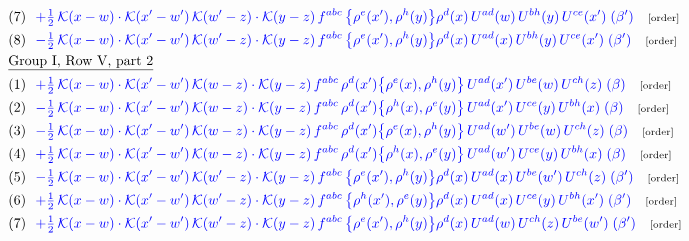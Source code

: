 \documentclass[9pt]{article}
\begin{document}
\begin{align}
&\quad\text{(7)}\ \ \textcolor{blue}{+\tfrac12\,\mathcal{K}(x-w)\cdot\mathcal{K}(x'-w')\,\mathcal{K}(w'-z)\cdot\mathcal{K}(y-z)\, f^{abc}\,\big\{\rho^{e}(x'),\rho^{h}(y)\big\}\rho^{d}(x)\,U^{ad}(w)\,U^{bh}(y)\,U^{ce}(x')\;(\beta')}\quad\text{\scriptsize[order]}\notag\\
&\quad\text{(8)}\ \ \textcolor{blue}{-\tfrac12\,\mathcal{K}(x-w)\cdot\mathcal{K}(x'-w')\,\mathcal{K}(w'-z)\cdot\mathcal{K}(y-z)\, f^{abc}\,\big\{\rho^{e}(x'),\rho^{h}(y)\big\}\rho^{d}(x)\,U^{ad}(x)\,U^{bh}(y)\,U^{ce}(x')\;(\beta')}\quad\text{\scriptsize[order]}\notag\\
&\quad\underline{\text{Group I, Row V, part 2}}\notag\\
&\quad\text{(1)}\ \ \textcolor{blue}{+\tfrac12\,\mathcal{K}(x-w)\cdot\mathcal{K}(x'-w')\,\mathcal{K}(w-z)\cdot\mathcal{K}(y-z)\, f^{abc}\,\rho^{d}(x')\big\{\rho^{e}(x),\rho^{h}(y)\big\}\,U^{ad}(x')\,U^{be}(w)\,U^{ch}(z)\;(\beta)}\quad\text{\scriptsize[order]}\notag\\
&\quad\text{(2)}\ \ \textcolor{blue}{-\tfrac12\,\mathcal{K}(x-w)\cdot\mathcal{K}(x'-w')\,\mathcal{K}(w-z)\cdot\mathcal{K}(y-z)\, f^{abc}\,\rho^{d}(x')\big\{\rho^{h}(x),\rho^{e}(y)\big\}\,U^{ad}(x')\,U^{ce}(y)\,U^{bh}(x)\;(\beta)}\quad\text{\scriptsize[order]}\notag\\
&\quad\text{(3)}\ \ \textcolor{blue}{-\tfrac12\,\mathcal{K}(x-w)\cdot\mathcal{K}(x'-w')\,\mathcal{K}(w-z)\cdot\mathcal{K}(y-z)\, f^{abc}\,\rho^{d}(x')\big\{\rho^{e}(x),\rho^{h}(y)\big\}\,U^{ad}(w')\,U^{be}(w)\,U^{ch}(z)\;(\beta)}\quad\text{\scriptsize[order]}\notag\\
&\quad\text{(4)}\ \ \textcolor{blue}{+\tfrac12\,\mathcal{K}(x-w)\cdot\mathcal{K}(x'-w')\,\mathcal{K}(w-z)\cdot\mathcal{K}(y-z)\, f^{abc}\,\rho^{d}(x')\big\{\rho^{h}(x),\rho^{e}(y)\big\}\,U^{ad}(w')\,U^{ce}(y)\,U^{bh}(x)\;(\beta)}\quad\text{\scriptsize[order]}\notag\\
&\quad\text{(5)}\ \ \textcolor{blue}{-\tfrac12\,\mathcal{K}(x-w)\cdot\mathcal{K}(x'-w')\,\mathcal{K}(w'-z)\cdot\mathcal{K}(y-z)\, f^{abc}\,\big\{\rho^{e}(x'),\rho^{h}(y)\big\}\rho^{d}(x)\,U^{ad}(x)\,U^{be}(w')\,U^{ch}(z)\;(\beta')}\quad\text{\scriptsize[order]}\notag\\
&\quad\text{(6)}\ \ \textcolor{blue}{+\tfrac12\,\mathcal{K}(x-w)\cdot\mathcal{K}(x'-w')\,\mathcal{K}(w'-z)\cdot\mathcal{K}(y-z)\, f^{abc}\,\big\{\rho^{h}(x'),\rho^{e}(y)\big\}\rho^{d}(x)\,U^{ad}(x)\,U^{ce}(y)\,U^{bh}(x')\;(\beta')}\quad\text{\scriptsize[order]}\notag\\
&\quad\text{(7)}\ \ \textcolor{blue}{+\tfrac12\,\mathcal{K}(x-w)\cdot\mathcal{K}(x'-w')\,\mathcal{K}(w'-z)\cdot\mathcal{K}(y-z)\, f^{abc}\,\big\{\rho^{e}(x'),\rho^{h}(y)\big\}\rho^{d}(x)\,U^{ad}(w)\,U^{ch}(z)\,U^{be}(w')\;(\beta')}\quad\text{\scriptsize[order]}\notag\\

\end{align}
\end{document}
